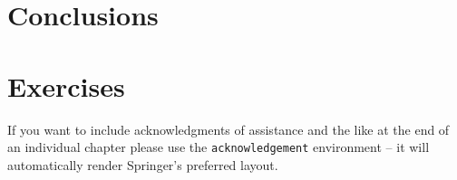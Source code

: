 \section{Conclusions}


\section{Exercises}

\begin{prob}

\end{prob}

\begin{acknowledgement}
If you want to include acknowledgments of assistance and the like at the end of an individual chapter please use the \verb|acknowledgement| environment -- it will automatically render Springer's preferred layout.
\end{acknowledgement}

